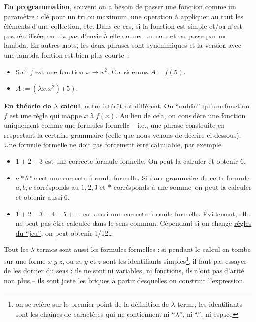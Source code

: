\textbf{En programmation}, souvent on a besoin de passer une fonction comme un paramètre : clé pour un tri ou maximum, une operation à appliquer au tout les éléments d'une collection, etc.
Dans ce cas, si la fonction est simple et/ou n'est pas réutilisée, on n'a pas d'envie à elle donner un nom et on passe par un lambda.
En autres mots, les deux phrases sont synonimiques et la version avec une lambda-fontion est bien plus courte~:
\begin{itemize}
	\item Soit $f$ est une fonction $x \to x^2$. Considerons $A = f(5)$.
	\item $A := (\lambda x.x^2) (5)$.
\end{itemize}

\textbf{En théorie de $\lambda$-calcul}, notre intérêt est différent.
On ``oublie'' qu'une fonction $f$ est une règle qui mappe $x$ à $f(x)$.
Au lieu de cela, on considère une fonction uniquement comme une formules formelle -- i.e., une phrase construite en respectant la certaine grammaire (celle que nous venons de décrire ci-dessous).
Une formule formelle ne doit pas forcement être calculable, par exemple
\begin{itemize}
	\item $1 + 2 + 3$ est une correcte formule formelle. On peut la calculer et obtenir 6.
	\item $a * b * c$ est une correcte formule formelle. Si dans grammaire de cette formule $a, b, c$ corrésponds au $1, 2, 3$ et $*$ corrésponds à une somme, on peut la calculer et obtenir aussi 6.
	\item $1 + 2 + 3 + 4 + 5 + \ldots$ est aussi une correcte formule formelle. Évidement, elle ne peut pas être calculée dans le sens commun. Cépendant si on change \href{https://en.wikipedia.org/wiki/Ramanujan_summation}{règles du ``jeu''}, on peut obtenir 1/12\ldots
\end{itemize}
Tout les $\lambda$-termes sont aussi les formules formelles : si pendant le calcul on tombe sur une forme $x \; y \; z$, ou $x$, $y$ et $z$ sont les identifiants simples\footnote{on se refère sur le premier point de la définition de $\lambda$-terme, les identifiants sont les chaînes de caractères qui ne contiennent ni ``$\lambda$'', ni ``.'', ni espace}, il faut pas essayer de les donner du sens : ils ne sont ni variables, ni fonctions, ils n'ont pas d'arité non plus -- ils sont juste les briques à partir desquelles on construit l'expression.

